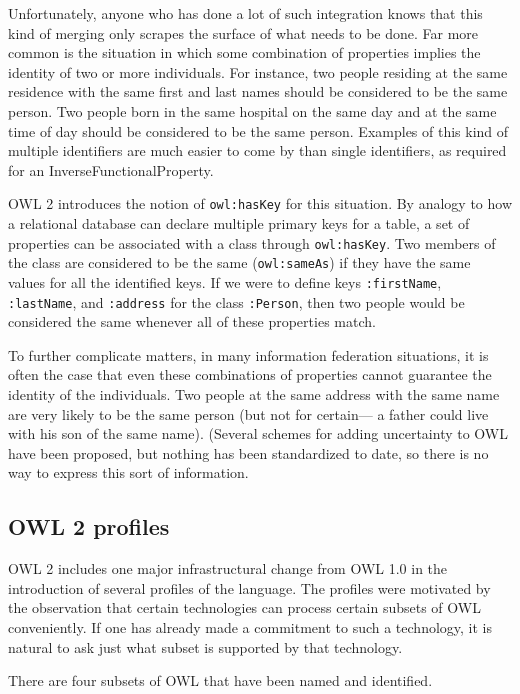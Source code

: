 Unfortunately, anyone who has done a lot of such integration knows that
this kind of merging only scrapes the surface of what needs to be done.
Far more common is the situation in which some combination of properties
implies the identity of two or more individuals. For instance, two
people residing at the same residence with the same first and last names
should be considered to be the same person. Two people born in the same
hospital on the same day and at the same time of day should be
considered to be the same person. Examples of this kind of multiple
identifiers are much easier to come by than single identifiers, as
required for an InverseFunctionalProperty.

OWL 2 introduces the notion of \texttt{owl:hasKey} for this situation. By analogy
to how a relational
database can declare multiple primary keys for a table, a set of
properties can be associated with a class through \texttt{owl:hasKey}. Two
members of the class are considered to be the same (\texttt{owl:sameAs}) if they
have the same values for all the identified keys. If we were to define
keys \texttt{:firstName},
\texttt{:lastName}, and \texttt{:address} for the class \texttt{:Person}, then two people would be
considered the same
whenever all of these properties match.

To further complicate matters, in many information federation
situations, it is often the case that even these combinations of
properties cannot guarantee the identity of the individuals. Two people
at the same address with the same name are very likely to be the same
person (but not for certain--- a father could live with his son of the
same name). (Several schemes for adding uncertainty to OWL have been proposed, but nothing has been standardized to date, so there is no
way to express this sort of information.

\subsection{OWL 2 profiles}

OWL 2 includes one major infrastructural change from OWL 1.0 in the
introduction of several profiles of the language. The profiles were
motivated by the observation that certain technologies can process
certain subsets of OWL conveniently. If one has already made a
commitment to such a technology, it is natural to ask just what subset
is supported by that technology.

There are four subsets of OWL that have been named and identified.

